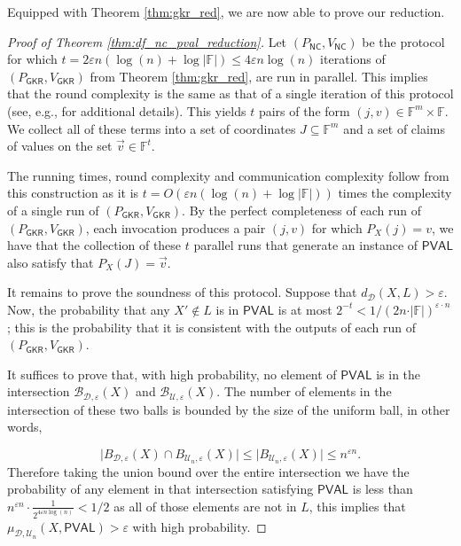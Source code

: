 \documentclass[10pt,a4paper]{article}
\newcommand{\NC}{\mathsf{NC}}
\newcommand{\PVAL}{\mathsf{PVAL}}
\newcommand{\F}{\mathbb{F}}
\newcommand{\sU}{\mathcal{U}}
\newcommand{\sD}{\mathcal{D}}
\newcommand{\sB}{\mathcal{B}}
\begin{document}
\noindent Equipped with Theorem \ref{thm:gkr_red}, we are now able to prove our reduction.

\begin{proof}[Proof of Theorem \ref{thm:df_nc_pval_reduction}]
Let $(P_{\NC}, V_{\NC})$ be the protocol for which $t=2\varepsilon n (\log (n) +\log \vert \mathbb{F}\vert )\leq 4\varepsilon n \log (n)$ iterations of $(P_{\mathsf{GKR}}, V_{\mathsf{GKR}})$ from Theorem \ref{thm:gkr_red}, are run in parallel. This implies that the round complexity is the same as that of a single iteration of this protocol (see, e.g., \cite[Appendix A]{GR17_round_hierarchy} for additional details). This yields $t$ pairs of the form $(j,v)\in \mathbb{F}^{m}\times \mathbb{F}$. We collect all of these terms into a set of coordinates $J\subseteq \mathbb{F}^{m}$ and a set of claims of values on the set $\vec{v}\in \mathbb{F}^{t}$.

The running times, round complexity and communication complexity follow from this construction as it is $t=O(\varepsilon n (\log (n) + \log \vert \mathbb{F} \vert ))$ times the complexity of a single run of $(P_{\mathsf{GKR}}, V_{\mathsf{GKR}})$. By the perfect completeness of each run of $(P_{\mathsf{GKR}}, V_{\mathsf{GKR}})$, each invocation produces a pair $(j,v)$ for which $P_X(j)=v$, we have that the collection of these $t$  parallel runs that generate an instance of $\PVAL$ also satisfy that $P_X(J)=\vec{v}$. 

It remains to prove the soundness of this protocol. Suppose that $d_{\mathcal{D}}(X,L)>\varepsilon$. Now, the probability that any $X'\not \in L$ is in $\PVAL$ is at most $2^{-t}<1/(2n\cdot \vert \F\vert )^{\varepsilon \cdot n}$; this is the probability that it is consistent with the outputs of each run of $(P_{\mathsf{GKR}}, V_{\mathsf{GKR}})$. 

It suffices to prove that, with high probability, no element of $\PVAL$ is in the intersection $\sB_{\sD,\varepsilon}(X)$ and $\sB_{\sU,\varepsilon}(X)$. The number of elements in the intersection of these two balls is bounded by the size of the uniform ball, in other words,

\begin{equation*}
    \vert B_{\mathcal{D},\varepsilon}(X)\cap B_{\mathcal{U}_{n},\varepsilon}(X)\vert\leq\vert B_{\mathcal{U}_{n},\varepsilon}(X)\vert\leq n^{\varepsilon n}.
\end{equation*}
Therefore taking the union bound over the entire intersection we have the probability of any element in that intersection satisfying $\PVAL$ is less than $n^{\varepsilon n} \cdot \frac{1}{2^{4 \varepsilon n \log (n)}}<1/2$ as all of those elements are not in $L$, this  implies that $\mu_{\mathcal{D}, \mathcal{U}_{n}}(X,\PVAL)>\varepsilon$ with high probability.
\end{proof}
\end{document}

